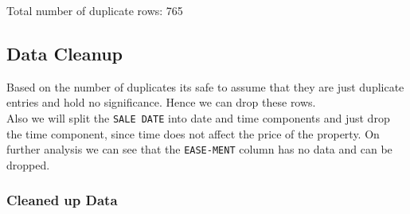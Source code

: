 \documentclass[
  a3paper,
]{article}
\begin{document}
Total number of duplicate rows: 765\\
\newpage

\hypertarget{data-cleanup}{%
\subsection{\texorpdfstring{\textbf{Data
Cleanup}}{Data Cleanup}}\label{data-cleanup}}

Based on the number of duplicates its safe to assume that they are just
duplicate entries and hold no significance. Hence we can drop these
rows.\\
Also we will split the \texttt{SALE\ DATE} into date and time components
and just drop the time component, since time does not affect the price
of the property. On further analysis we can see that the
\texttt{EASE-MENT} column has no data and can be dropped.

\hypertarget{cleaned-up-data}{%
\subsubsection{\texorpdfstring{\textbf{Cleaned up
Data}}{Cleaned up Data}}\label{cleaned-up-data}}
\end{document}
